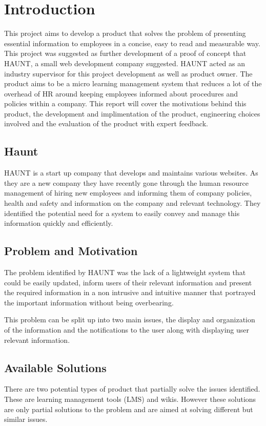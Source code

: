 \chapter{Introduction}\label{C:intro}
This project aims to develop a product that solves the problem of presenting essential information to employees in a concise, easy to read and measurable way. This project was suggested as further development of a proof of concept that HAUNT, a small web development company suggested. HAUNT acted as an industry supervisor for this project development as well as product owner. The product aims to be a micro learning management system that reduces a lot of the overhead of HR around keeping employees informed about procedures and policies within a company. This report will cover the motivations behind this product, the development and implimentation of the product, engineering choices involved and the evaluation of the product with expert feedback.

\section{Haunt}
HAUNT is a start up company that develops and maintains various websites. As they are a new company they have recently gone through the human resource management of hiring new employees and informing them of company policies, health and safety and information on the company and relevant technology. They identified the potential need for a system to easily convey and manage this information quickly and efficiently.

\section{Problem and Motivation}
The problem identified by HAUNT was the lack of a lightweight system that could be easily updated, inform users of their relevant information and present the required information in a non intrusive and intuitive manner that portrayed the important information without being overbearing.

This problem can be split up into two main issues, the display and organization of the information and the notifications to the user along with displaying user relevant information.

\section{Available Solutions}
There are two potential types of product that partially solve the issues identified. These are learning management tools (LMS) and wikis. However these solutions are only partial solutions to the problem and are aimed at solving different but similar issues.
